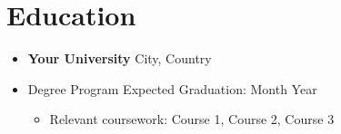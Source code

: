 \section*{Education}
\begin{itemize}
    \item[] \textbf{Your University} \hfill City, Country
    \item[] Degree Program \hfill Expected Graduation: Month Year
    \begin{itemize}
        \item Relevant coursework: Course 1, Course 2, Course 3
    \end{itemize}
\end{itemize}
\sectionspace 